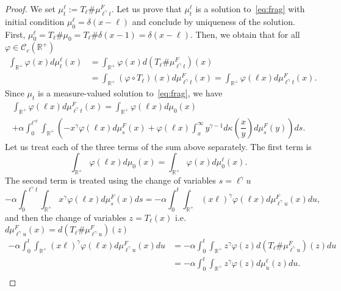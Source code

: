 \documentclass[AHL,Unicode,longabstracts,published]{cedram}
\newcommand*\dst{\displaystyle}
\renewcommand*\a{\alpha}
\newcommand*\R{\mathbb{R}}
\newcommand{\clC}{\mathcal{C}}
\begin{document}
\begin{proof}
We set $\mu_t^{\ell}:= T_{\ell} \# \mu_{\ell^{\gamma}t}^{F}$. Let us prove that $\mu_t^{\ell}$ is a solution to~\eqref{eq:frag} with initial condition $\mu_0^{\ell}=\delta(x-\ell)$ and conclude by uniqueness of the solution. First, $\mu_0^{\ell} = T_{\ell}\# \mu_0 = T_{\ell}\# \delta(x-1) =\delta(x-\ell)$. Then, we obtain that for all $\varphi\in \clC_c(\R^+)$
\begin{align*}
\dst\int_{\R^+} \varphi(x) d\mu_t^{\ell}(x) &= \dst\int_{\R^+} \varphi(x) d\left(T_{\ell}\# \mu_{\ell^{\gamma}t}^{F}\right)(x) \\
&= \dst\int_{\R^+} (\varphi\circ T_{\ell})(x) d \mu_{\ell^{\gamma}t}^{F}(x) = \dst\int_{\R^+} \varphi(\ell x) d \mu_{\ell^{\gamma}t}^{F}(x).
\end{align*}
Since $\mu_t$ is a measure-valued solution to~\eqref{eq:frag}, we have
\begin{multline*}
\dst\int_{\R^+} \varphi(\ell x) d \mu_{\ell^{\gamma}t}^{F}(x)
=
\int_{\R^+} \varphi(\ell x) d\mu_0(x)\\
+\a \dst\int_0^{\ell^{\gamma t}} \dst\int_{\R^+}
\left(-x^{\gamma} \varphi(\ell x)d\mu_s^{F}(x)+ \varphi(\ell x)\dst\int_x^{\infty}y^{\gamma-1} d\kappa\left(\dfrac{x}{y}\right)d\mu_s^{F}(y)\right)ds.
\end{multline*}
Let us treat each of the three terms of the sum above separately. The first term is
\begin{equation*}
\int_{\R^+} \varphi(\ell x) d\mu_0(x) =
\int_{\R^+} \varphi(x) d\mu_0^{\ell}(x).
\end{equation*}
The second term is treated using the change of variables $s=\ell^{\gamma}u$
\begin{equation*}
-\a \dst\int_0^{\ell^{\gamma} t} \dst\int_{\R^+} x^{\gamma} \varphi(\ell x)d\mu_s^{F}(x)ds= -\a \dst\int_0^{t} \dst\int_{\R^+}
\left(x\ell\right)^{\gamma} \varphi(\ell x)d\mu_{\ell^{\gamma}u}^{F}(x)du,
\end{equation*}
and then the change of variables $z=T_{\ell}(x)$ i.e. $d\mu_{\ell^{\gamma}u}^{F}(x)= d(T_{\ell} \#\mu_{\ell^{\gamma}u}^{F})(z)$
\begin{align*}
-\a \dst\int_0^{t} \dst\int_{\R^+}
\left(x\ell\right)^{\gamma} \varphi(\ell x)d\mu_{\ell^{\gamma}u}^{F}(x)du &= -\a \dst\int_0^{t} \dst\int_{\R^+} z^{\gamma} \varphi(z)d\left(T_{\ell} \# \mu_{\ell^{\gamma}u}^{F}\right)(z)du\\
&= -\a \dst\int_0^{t} \dst\int_{\R^+} z^{\gamma} \varphi(z)d\mu_u^{\ell}(z)du.\\

\end{align*}
\end{proof}
\end{document}
